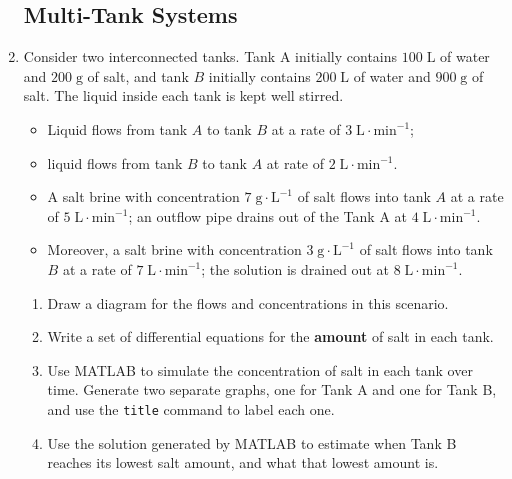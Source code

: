 \begin{enumerate}[1.]
\subsection*{Multi-Tank Systems}

\item \begin{Question}
Consider two interconnected tanks.  Tank A initially contains $100 \; \text{L}$
of water and $200 \; \text{g}$ of salt, and tank $B$ initially contains $200 \;
\text{L}$ of water and $900 \; \text{g}$ of salt.  The liquid inside each tank is
kept well stirred.  
\begin{itemize}
\item Liquid flows from tank $A$ to tank $B$ at a rate of $3 \;
\text{L} \cdot \text{min}^{-1}$;
\item liquid flows from tank $B$ to tank $A$ at rate of $2 \; \text{L} \cdot \text{min}^{-1}$.  
\item A salt brine with concentration $7 \; \text{g} \cdot \text{L}^{-1}$ of salt flows into tank $A$ at a rate of $5 \; \text{L} \cdot \text{min}^{-1}$; an outflow pipe drains out of the Tank A at $4 \; \text{L} \cdot \text{min}^{-1}$.  
\item Moreover, a salt brine with concentration
  $3 \; \text{g} \cdot \text{L}^{-1}$ of salt flows into tank $B$ at a
  rate of $7 \; \text{L} \cdot \text{min}^{-1}$; the solution is drained 
  out at $8 \; \text{L} \cdot \text{min}^{-1}$. 
\end{itemize}
\begin{enumerate}
\item Draw a diagram for the flows and concentrations in this scenario.
\item Write a set of differential equations for the {\bf amount} of
  salt in each tank.
\item Use MATLAB to simulate the concentration of salt in each tank
  over time.  Generate two separate graphs, one for Tank A and one for
  Tank B, and use the \verb#title# command to label each one.
\item Use the solution generated by MATLAB to estimate when Tank B
  reaches its lowest salt amount, and what that lowest amount is.
\end{enumerate}
  
\end{Question}


\end{enumerate}
